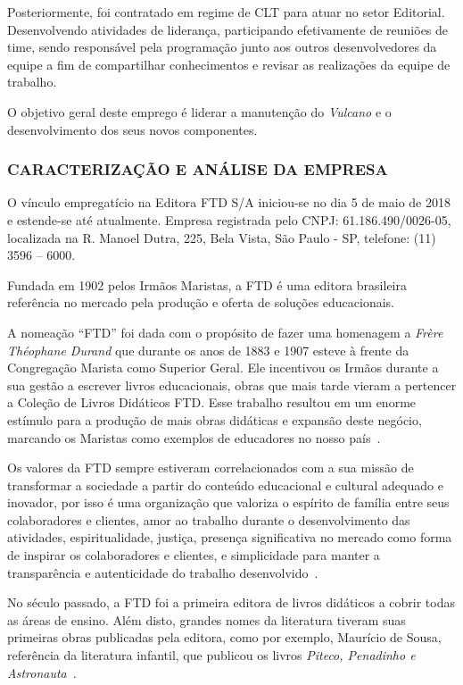\documentclass[
  12pt,				%
  openany,
  oneside,
  a4paper,			%
  english,			%
  brazil
]{article}
\numberwithin{figure}{section}
\numberwithin{table}{section}
\begin{document}
Posteriormente, foi contratado em regime de CLT para atuar no setor Editorial. Desenvolvendo atividades de liderança, participando efetivamente de reuniões de time, sendo responsável pela programação junto aos outros desenvolvedores da equipe a fim de compartilhar conhecimentos e revisar as realizações da equipe de trabalho.

O objetivo geral deste emprego é liderar a manutenção do \textit{Vulcano} e o desenvolvimento dos seus novos componentes.


\subsubsection{CARACTERIZAÇÃO E ANÁLISE DA EMPRESA}


O vínculo empregatício na Editora FTD S/A iniciou-se no dia 5 de maio de 2018 e estende-se até atualmente. Empresa registrada pelo CNPJ: 61.186.490/0026-05, localizada na R. Manoel Dutra, 225, Bela Vista, São Paulo - SP, telefone: (11) 3596 – 6000.

Fundada em 1902 pelos Irmãos Maristas, a FTD é uma editora brasileira referência no mercado pela produção e oferta de soluções educacionais.

A nomeação ``FTD'' foi dada com o propósito de fazer uma homenagem a \textit{Frère Théophane Durand} que durante os anos de 1883 e 1907 esteve à frente da Congregação Marista como Superior Geral. Ele incentivou os Irmãos durante a sua gestão a escrever livros educacionais, obras que mais tarde vieram a pertencer a Coleção de Livros Didáticos FTD. Esse trabalho resultou em um enorme estímulo para a produção de mais obras didáticas e expansão deste negócio, marcando os Maristas como exemplos de educadores no nosso país~\cite{site_ftd}. 

Os valores da FTD sempre estiveram correlacionados com a sua missão de transformar a sociedade a partir do conteúdo educacional e cultural adequado e inovador, por isso é uma organização que valoriza o espírito de família entre seus colaboradores e clientes, amor ao trabalho durante o desenvolvimento das atividades, espiritualidade, justiça, presença significativa no mercado como forma de inspirar os colaboradores e clientes, e simplicidade para manter a transparência e autenticidade do trabalho desenvolvido~\cite{site_ftd}.

No século passado, a FTD foi a primeira editora de livros didáticos a cobrir todas as áreas de ensino. Além disto, grandes nomes da literatura tiveram suas primeiras obras publicadas pela editora, como por exemplo, Maurício de Sousa, referência da literatura infantil, que publicou os livros \textit{Piteco, Penadinho e Astronauta}~\cite{site_ftd}.
\end{document}
